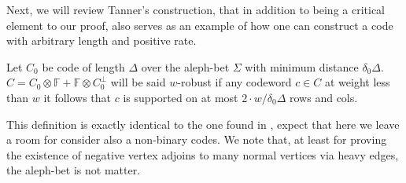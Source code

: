\documentclass[manuscript,screen,review]{acmart}
\begin{document}



Next, we will review Tanner's construction, that in addition to being a critical element to our proof, also serves as an example of how one can construct a code with arbitrary length and positive rate.


\begin{definition}[$w$-Robustness] Let $C_{0}$ be code of length $\Delta$ over the aleph-bet $\Sigma$ with minimum distance $\delta_{0}\Delta$. $C = C_{0} \otimes \mathbb{F} + \mathbb{F}\otimes C_{0}^{\perp}$ will be said $w$-robust if any codeword $c \in C$ at weight less than $w$ it follows that $c$ is supported on at most $2\cdot w/\delta_{0}\Delta$ rows and cols.
\end{definition}

This definition is exactly identical to the one found in \cite{leverrier2022quantum}, expect that here we leave a room for consider also a non-binary codes. We note that, at least for proving the existence of negative vertex adjoins to many normal vertices via heavy edges, the aleph-bet is not matter.  

\printbibliography 
\end{document}
